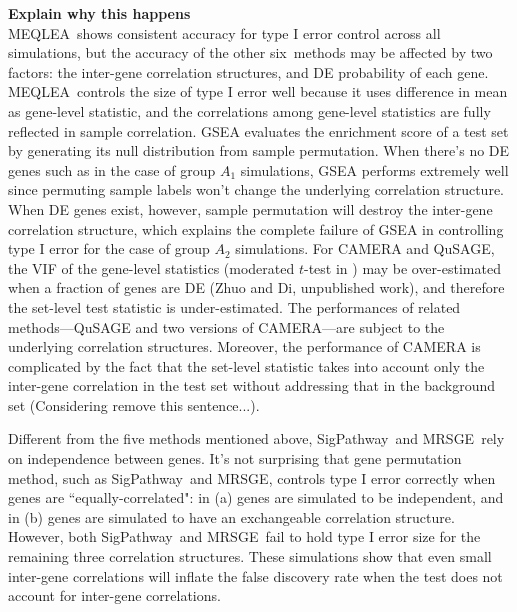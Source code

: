 \documentclass[useAMS,usenatbib, galley]{biom}
\newcommand{\OurMethod}{MEQLEA}
\newcommand{\HowmanyTest}{six}
\newcommand{\aaCase}{a}
\newcommand{\aCase}{c}
\newcommand{\cCase}{b}
\newcommand{\eCase}{d}
\newcommand{\fCase}{e}
\newcommand{\gent}{SigPathway}
\newcommand{\gen}{geneSetTest}
\newcommand{\genr}{MRSGE}
\newcommand{\thepapertobefinished}{Zhuo and Di, unpublished work}
\begin{document}
	\textbf{Explain why this happens}\\
	\OurMethod~shows consistent accuracy for type I error control across all simulations, but the accuracy of the other \HowmanyTest~methods may be affected by two factors: the inter-gene correlation structures, and DE probability of each gene. \OurMethod~controls the size of type I error well because it uses difference in mean as gene-level statistic, and the correlations among gene-level statistics are fully reflected in sample correlation. GSEA evaluates the enrichment score of a test set by generating its null distribution from sample permutation. When there's no DE genes such as in the case of group $A_1$ simulations, GSEA performs extremely well since permuting sample labels won't change the underlying correlation structure. When DE genes exist, however, sample permutation will destroy the inter-gene correlation structure, which explains the complete failure of GSEA in controlling type I error for the case of group $A_2$ simulations. For CAMERA and QuSAGE, the VIF of the gene-level statistics (moderated $t$-test in \cite{wu2012camera}) may be over-estimated when a fraction of genes are DE (\thepapertobefinished), and therefore the set-level test statistic is under-estimated. The performances of related methods---QuSAGE and two versions of CAMERA---are subject to the underlying correlation structures. Moreover, the performance of CAMERA is complicated by the fact that the set-level statistic takes into account only the inter-gene correlation in the test set without addressing that in the background set (Considering remove this sentence...).
	
	Different from the five methods mentioned above, \gent~and \genr~rely on independence between genes. It's not surprising that gene permutation method, such as \gent~and \genr, controls type I error correctly when genes are ``equally-correlated": in (\aaCase) genes are simulated to be independent, and in (\cCase) genes are simulated to have an exchangeable correlation structure. However, both \gent~and \genr~fail to hold type I error size for the remaining three correlation structures. These simulations show that even small inter-gene correlations will inflate the false discovery rate when the test does not account for inter-gene correlations.  
	
	
\end{document}
